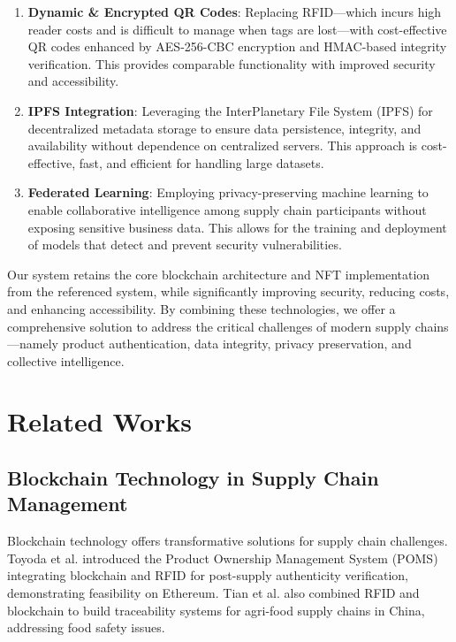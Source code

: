 \documentclass[conference]{IEEEtran}
\begin{document}
\begin{enumerate}
\item \textbf{Dynamic \& Encrypted QR Codes}: Replacing RFID—which incurs high reader costs and is difficult to manage when tags are lost—with cost-effective QR codes enhanced by AES-256-CBC encryption and HMAC-based integrity verification. This provides comparable functionality with improved security and accessibility.

\item \textbf{IPFS Integration}: Leveraging the InterPlanetary File System (IPFS) for decentralized metadata storage to ensure data persistence, integrity, and availability without dependence on centralized servers. This approach is cost-effective, fast, and efficient for handling large datasets.


\item \textbf{Federated Learning}: Employing privacy-preserving machine learning to enable collaborative intelligence among supply chain participants without exposing sensitive business data. This allows for the training and deployment of models that detect and prevent security vulnerabilities.
\end{enumerate}

Our system retains the core blockchain architecture and NFT implementation from the referenced system, while significantly improving security, reducing costs, and enhancing accessibility. By combining these technologies, we offer a comprehensive solution to address the critical challenges of modern supply chains—namely product authentication, data integrity, privacy preservation, and collective intelligence.

\section{Related Works}

\subsection{Blockchain Technology in Supply Chain Management}

Blockchain technology offers transformative solutions for supply chain challenges. Toyoda et al. \cite{toyoda2017novel} introduced the Product Ownership Management System (POMS) integrating blockchain and RFID for post-supply authenticity verification, demonstrating feasibility on Ethereum. Tian et al. \cite{tian2017supply} also combined RFID and blockchain to build traceability systems for agri-food supply chains in China, addressing food safety issues.
\end{document}
